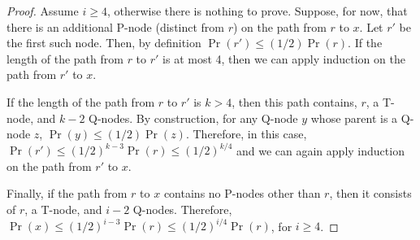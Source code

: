 \documentclass[lotsofwhite]{patmorin}
\newcommand{\prnt}{\mathrm{parent}}
\begin{document}
\begin{proof}
Assume $i\ge 4$, otherwise there is nothing to prove. 
Suppose, for now, that there is an additional P-node (distinct from $r$)
on the path from $r$ to $x$.  Let $r'$ be the first such node.  Then, by
definition $\Pr(r')\le (1/2)\Pr(r)$. If the length of the path from $r$
to $r'$ is at most 4, then we can apply induction on the path from $r'$
to $x$.  

If the length of the path from $r$ to $r'$ is $k>4$, then this path
contains, $r$, a T-node, and $k-2$ Q-nodes.  By construction, for
any Q-node $y$ whose parent is a Q-node $z$, $\Pr(y)\le(1/2)\Pr(z)$.
Therefore, in this case, $\Pr(r') \le (1/2)^{k-3}\Pr(r)\le (1/2)^{k/4}$
and we can again apply induction on the path from $r'$ to $x$.

Finally, if the path from $r$ to $x$ contains no P-nodes other than
$r$, then it consists of $r$, a T-node, and $i-2$ Q-nodes.  Therefore,
$\Pr(x)\le (1/2)^{i-3}\Pr(r)\le (1/2)^{i/4}\Pr(r)$, for $i\ge 4$.
\end{proof}
%
%
%
\end{document}
